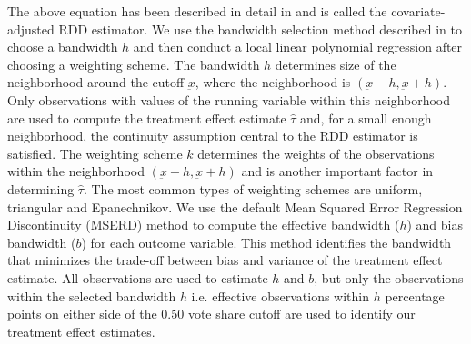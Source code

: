 The above equation has been described in detail in \cite{calonico2019regression} and is called the covariate-adjusted RDD estimator. We use the bandwidth selection method described in \cite{calonico2019regression} to choose a bandwidth $h$ and then conduct a local linear polynomial regression after choosing a weighting scheme. The bandwidth $h$ determines size of the neighborhood around the cutoff $\underbar{x}$, where the neighborhood is $(\underbar{x}-h, \underbar{x}+h)$. Only observations with values of the running variable within this neighborhood are used to compute the treatment effect estimate $\hat{\tau}$ and, for a small enough neighborhood, the continuity assumption central to the RDD estimator is satisfied. The weighting scheme $k$ determines the weights of the observations within the neighborhood $(\underbar{x}-h, \underbar{x}+h)$ and is another important factor in determining $\hat{\tau}$. The most common types of weighting schemes are uniform, triangular and Epanechnikov. We use the default Mean Squared Error Regression Discontinuity (MSERD) method to compute the effective bandwidth ($h$) and bias bandwidth ($b$) for each outcome variable. This method identifies the bandwidth that minimizes the trade-off between bias and variance of the treatment effect estimate. All observations are used to estimate $h$ and $b$, but only the observations within the selected bandwidth $h$ i.e. effective observations within $h$ percentage points on either side of the 0.50 vote share cutoff are used to identify our treatment effect estimates.

